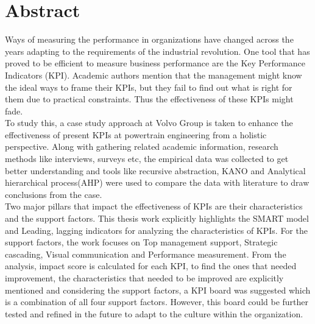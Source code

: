 
\thispagestyle{plain}			%
\setlength{\parskip}{0pt plus 1.0pt}
\section*{Abstract}
Ways of measuring the performance in organizations have changed across the years adapting to the requirements of the industrial revolution. One tool that has proved to be efficient to measure business performance are the Key Performance Indicators (KPI). Academic authors mention that the management might know the ideal ways to frame their KPIs, but they fail to find out what is right for them due to practical constraints. Thus the effectiveness of these KPIs might fade.\\ 

To study this, a case study approach at Volvo Group is taken to enhance the effectiveness of present KPIs at powertrain engineering from a holistic perspective. Along with gathering related academic information, research methods like interviews, surveys etc, the empirical data was collected to get better understanding and tools like recursive abstraction, KANO and Analytical hierarchical process(AHP) were used to compare the data with literature to draw conclusions from the case.\\

Two major pillars that impact the effectiveness of KPIs are their characteristics and the support factors. This thesis work explicitly highlights the SMART model and Leading, lagging indicators for analyzing the characteristics of KPIs. For the support factors, the work focuses on Top management support, Strategic cascading, Visual communication and Performance measurement. From the analysis, impact score is calculated for each KPI, to find the ones that needed improvement, the characteristics that needed to be improved are explicitly mentioned and considering the support factors, a KPI board was suggested which is a combination of all four support factors. However, this board could be further tested and refined in the future to adapt to the culture within the organization.\\

